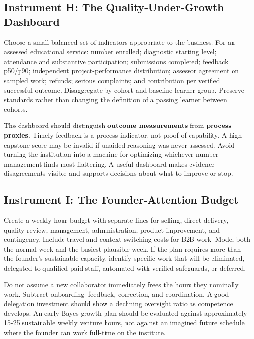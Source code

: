 \subsection{Instrument H: The Quality-Under-Growth Dashboard}
\label{sec:instrument_h_quality_dashboard}

Choose a small balanced set of indicators appropriate to the business. For an assessed educational service: number enrolled; diagnostic starting level; attendance and substantive participation; submissions completed; feedback p50/p90; independent project-performance distribution; assessor agreement on sampled work; refunds; serious complaints; and contribution per verified successful outcome. Disaggregate by cohort and baseline learner group. Preserve standards rather than changing the definition of a passing learner between cohorts.

The dashboard should distinguish \textbf{outcome measurements} from \textbf{process proxies}. Timely feedback is a process indicator, not proof of capability. A high capstone score may be invalid if unaided reasoning was never assessed. Avoid turning the institution into a machine for optimizing whichever number management finds most flattering. A useful dashboard makes evidence disagreements visible and supports decisions about what to improve or stop.

\subsection{Instrument I: The Founder-Attention Budget}
\label{sec:instrument_i_founder_attention_budget}

Create a weekly hour budget with separate lines for selling, direct delivery, quality review, management, administration, product improvement, and contingency. Include travel and context-switching costs for B2B work. Model both the normal week and the busiest plausible week. If the plan requires more than the founder's sustainable capacity, identify specific work that will be eliminated, delegated to qualified paid staff, automated with verified safeguards, or deferred.

Do not assume a new collaborator immediately frees the hours they nominally work. Subtract onboarding, feedback, correction, and coordination. A good delegation investment should show a declining oversight ratio as competence develops. An early Bayes growth plan should be evaluated against approximately 15-25 sustainable weekly venture hours, not against an imagined future schedule where the founder can work full-time on the institute.

